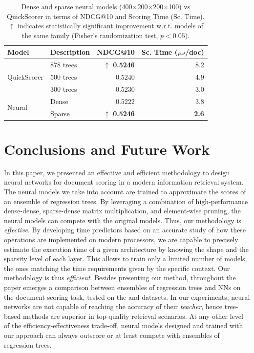 \begin{table}[t]
	\centering
	\begin{tabular}{llrr}
		\toprule
		Model & Description & NDCG@10 & Sc. Time ($\mu s$/doc) \\
		\midrule
		\multirow{3}{*}{QuickScorer} & 878 trees & $\uparrow$ \textbf{0.5246} & 8.2 \\
		& 500 trees & 0.5240 & 4.9 \\
		& 300 trees & 0.5230 & 3.0 \\
		\midrule
		\multirow{2}{*}{Neural} & Dense & 0.5222 & 3.8 \\
		& Sparse & $\uparrow$ \textbf{0.5246} & \textbf{2.6} \\ 
 		\bottomrule
	\end{tabular}
	\caption{Dense and sparse neural models (400$\times$200$\times$200$\times$100)  vs QuickScorer in terms of NDCG@10 and Scoring Time (Sc. Time). $\uparrow$ indicates statistically significant improvement w.r.t. models of the same family (Fisher's randomization test,  $p < 0.05$).\label{table:sparse_400x200x200x100_partial}}
\end{table}


\section{Conclusions and Future Work}
\label{sec:conclusions}
In this paper, we presented an effective and efficient methodology to design neural networks for document scoring in a modern information retrieval system. The neural models we take into account are trained to approximate the scores of an ensemble of regression trees. By leveraging a combination of high-performance dense-dense, sparse-dense matrix multiplication, and element-wise pruning, the neural models can compete with the original models.
Thus, our methodology is \textit{effective}. By developing time predictors based on an accurate study of how these operations are implemented on modern processors, we are capable to precisely estimate the execution time of a given architecture by knowing the shape and the sparsity level of each layer. This allows to train only a limited number of models, the ones matching the time requirements given by the specific context. Our methodology is thus \textit{efficient}. Besides presenting our method, throughout the paper emerges a comparison between ensembles of regression trees and NNs on the document scoring task, tested on the \msn and \istella datasets. In our experiments,  neural networks are not capable of reaching the accuracy of their \textit{teacher}, hence tree-based methods are superior in top-quality retrieval scenarios. At any other level of the efficiency-effectiveness trade-off, neural models designed and trained with our approach can always outscore or at least compete with ensembles of regression trees.

